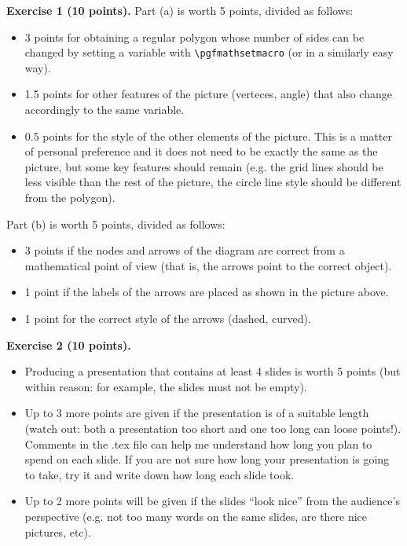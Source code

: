 \documentclass[12pt,a4paper]{article}
\theoremstyle{definition}
\theoremstyle{definition}
\newcommand{\bs}{\textbackslash}
\begin{document}
\vspace{0.3cm}
\noindent\textbf{Exercise 1 (10 points).}
Part (a) is worth 5 points, divided as follows:
\begin{itemize}
  \item 3 points for obtaining a regular polygon whose number of sides
        can be changed by setting a variable with \texttt{\bs pgfmathsetmacro}
        (or in a similarly easy way).
  \item 1.5 points for other features of the picture (verteces, angle) that
        also change accordingly to the same variable.
  \item 0.5 points for the style of the other elements of the picture. This is
        a matter of personal preference and it does not need to be exactly the
        same as the picture, but some key features should remain (e.g.
        the grid lines should be less visible than the rest of the picture,
        the circle line style should be different from the polygon).
\end{itemize}
Part (b) is worth 5 points, divided as follows:
\begin{itemize}
  \item 3 points if the nodes and arrows of the diagram are correct from a
        mathematical point of view (that is, the arrows point to the correct
        object).
  \item 1 point if the labels of the arrows are placed as shown in the picture
        above.
  \item 1 point for the correct style of the arrows (dashed, curved).
\end{itemize}

\vspace{0.2cm}
\noindent\textbf{Exercise 2 (10 points).}
\begin{itemize}
  \item Producing a presentation that contains at least 4 slides is worth
        5 points (but within reason: for example, the slides must not be empty).
  \item Up to 3 more points are given if the presentation is of a suitable
        length (watch out: both a presentation too short and one too long can
        loose points!).
        Comments in the .tex file can help me understand how long you plan to
        spend on each slide. If you are not sure how long your presentation is
        going to take, try it and write down how long each slide took.
  \item Up to 2 more points will be given if the slides ``look nice'' from
        the audience's perspective (e.g. not too many words on the same slides,
        are there nice pictures, etc).
\end{itemize}
\end{document}
